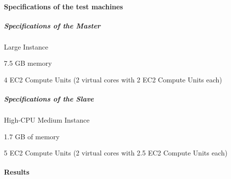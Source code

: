\paragraph{Specifications of the test machines}
\subparagraph{Specifications of the Master}
\begin{packed_itemize}
\item Large Instance
\item 7.5 GB memory
\item 4 EC2 Compute Units (2 virtual cores with 2 EC2 Compute Units each)
\end{packed_itemize}

\subparagraph{Specifications of the Slave}
\begin{packed_itemize}
\item High-CPU Medium Instance
\item 1.7 GB of memory
\item 5 EC2 Compute Units (2 virtual cores with 2.5 EC2 Compute Units each)
\end{packed_itemize}

\paragraph{Results}

